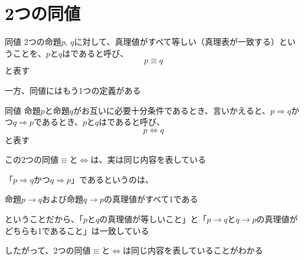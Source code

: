 \documentclass[b5paper,12pt]{jsarticle}
\begin{document}
\sectionline
\section{2つの同値}

\begin{definition}{同値}
  2つの命題$p, \, q$に対して、真理値がすべて等しい（真理表が一致する）ということを、$p$と$q$はであると呼び、
  \begin{equation*}
    p \equiv q
  \end{equation*}
  と表す
\end{definition}

一方、同値にはもう1つの定義がある

\begin{definition}{同値}
  命題$p$と命題$q$がお互いに必要十分条件であるとき、言いかえると、$p \Rightarrow q$かつ$q \Rightarrow p$であるとき、$p$と$q$はであると呼び、
  \begin{equation*}
    p \Leftrightarrow q
  \end{equation*}
  と表す
\end{definition}

この2つの同値$\equiv$と$\Leftrightarrow$は、実は同じ内容を表している

\br

「$p \Rightarrow q$かつ$q \Rightarrow p$」であるというのは、

\begin{shaded}
  命題$p \to q$および命題$q \to p$の真理値がすべて1である
\end{shaded}

ということだから、「$p$と$q$の真理値が等しいこと」と「$p \to q$と$q \to p$の真理値がどちらも1であること」は一致している

\br

したがって、2つの同値$\equiv$と$\Leftrightarrow$は同じ内容を表していることがわかる
\end{document}
